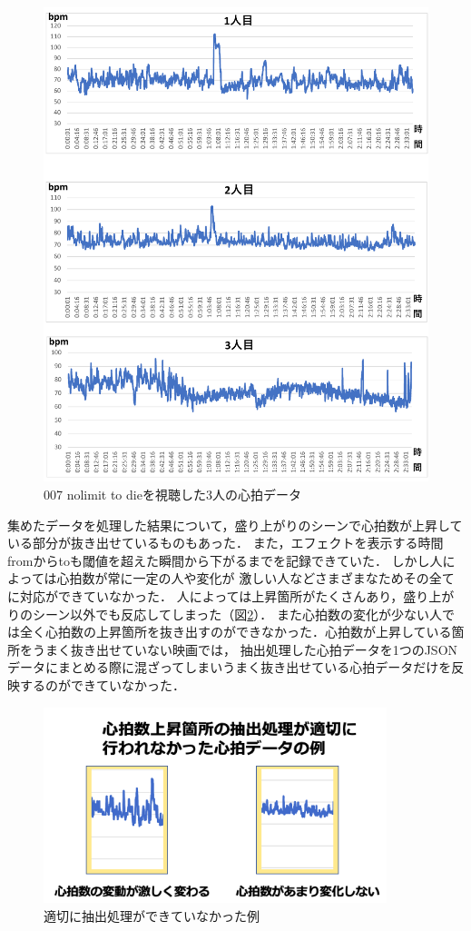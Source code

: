 \begin{figure}[H]
    \centering
    \includegraphics[width=14cm]{images/chapter4/nolimitto.pdf}
    \caption{007 nolimit to dieを視聴した3人の心拍データ}
    \label{nolimit}
\end{figure}

集めたデータを処理した結果について，盛り上がりのシーンで心拍数が上昇している部分が抜き出せているものもあった．
また，エフェクトを表示する時間fromからtoも閾値を超えた瞬間から下がるまでを記録できていた．
しかし人によっては心拍数が常に一定の人や変化が 激しい人などさまざまなためその全てに対応ができていなかった．
人によっては上昇箇所がたくさんあり，盛り上がりのシーン以外でも反応してしまった（図\ref{kekka}）．
また心拍数の変化が少ない人では全く心拍数の上昇箇所を抜き出すのができなかった．心拍数が上昇している箇所をうまく抜き出せていない映画では，
抽出処理した心拍データを1つのJSONデータにまとめる際に混ざってしまいうまく抜き出せている心拍データだけを反映するのができていなかった．


\begin{figure}[H]
    \centering
    \includegraphics[width=10cm]{images/chapter4/miss.png}
    \caption{適切に抽出処理ができていなかった例}
    \label{kekka}
\end{figure}


